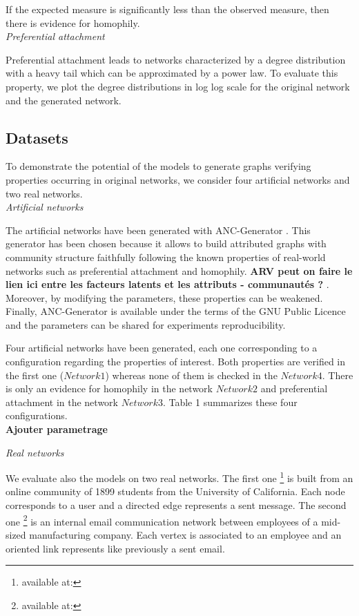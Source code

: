 If the expected measure is significantly less than the observed measure, then there is evidence for homophily.\\

\textit{Preferential attachment}

Preferential attachment leads to networks characterized by a degree distribution with a heavy tail which can be approximated by a power law. To evaluate this property, we  plot the degree distributions in log log scale for the original network and the generated network.

\subsection{Datasets}
To demonstrate the potential of the models to generate graphs verifying properties occurring in original networks, we consider four artificial networks and two real networks.\\

\textit{Artificial networks}

The artificial networks have been generated with ANC-Generator \cite{largeron2015}. This generator has been chosen because it allows to build attributed graphs with community structure faithfully following the known properties of real-world networks such as preferential attachment and homophily. 
\textbf{ ARV peut on faire le lien ici entre les facteurs latents et les attributs - communautés ? }.
Moreover, by modifying the parameters, these properties can be weakened. Finally, ANC-Generator is available under the terms of the GNU Public Licence and the parameters can be shared for experiments reproducibility. 

Four artificial networks have been generated, each one corresponding to a configuration  regarding the properties of interest.
Both properties are verified in the first one ($Network1$) whereas none of them is checked in the $Network4$.  There is only an evidence for homophily in the network $Network2$ and  preferential attachment in the network  $Network3$. Table 1 summarizes these four configurations. \\ 

\textbf{Ajouter parametrage}  

\textit{Real networks}

We evaluate also the models on two  real networks.
The first one \footnote{available at:} is built from an online community of 1899 students from the University of California. Each node corresponds to a user and a directed edge represents a sent message. 
The second one \footnote{available at:} is an internal email communication network between employees of a mid-sized manufacturing company. Each vertex is associated to an employee and an oriented link represents like previously a sent email.

